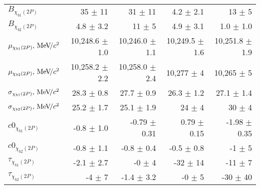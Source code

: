 \begin{table}[H]
{{\begin{tabular}{lrrrr}
\rule{0pt}{4ex}$B_{\chi_{b1}(2P)}$ & 35 $\pm$ 11 & 31 $\pm$ 11 & 4.2 $\pm$ 2.1 & 13 $\pm$ 5\\
$B_{\chi_{b2}(2P)}$ & 4.8 $\pm$ 3.2 & 11 $\pm$ 5 & 4.9 $\pm$ 3.1 & 1.0 $\pm$ 1.0\\

\rule{0pt}{4ex}$\mu_{\chi_{b1}(2P)}, {\mathrm{\,Me\kern -0.1em V\!/}c^2}$ & 10,248.6 $\pm$ 1.0 & 10,246.0 $\pm$ 1.1 & 10,249.5 $\pm$ 1.6 & 10,251.8 $\pm$ 1.9\\
$\mu_{\chi_{b2}(2P)}, {\mathrm{\,Me\kern -0.1em V\!/}c^2}$ & 10,258.2 $\pm$ 2.2 & 10,258.0 $\pm$ 2.4 & 10,277 $\pm$ 4 & 10,265 $\pm$ 5\\

\rule{0pt}{4ex}$\sigma_{\chi_{b1}(2P)}, {\mathrm{\,Me\kern -0.1em V\!/}c^2}$ & 28.3 $\pm$ 0.8 & 27.7 $\pm$ 0.9 & 26.3 $\pm$ 1.2 & 27.1 $\pm$ 1.4\\
$\sigma_{\chi_{b2}(2P)}, {\mathrm{\,Me\kern -0.1em V\!/}c^2}$ & 25.2 $\pm$ 1.7 & 25.1 $\pm$ 1.9 & 24 $\pm$ 4 & 30 $\pm$ 4\\

\rule{0pt}{4ex}$c0_{\chi_{b1}(2P)}$ & -0.8 $\pm$ 1.0 & -0.79 $\pm$ 0.31 & 0.79 $\pm$ 0.15 & -1.98 $\pm$ 0.35\\
$c0_{\chi_{b2}(2P)}$ & -0.8 $\pm$ 1.1 & -0.8 $\pm$ 0.4 & -0.5 $\pm$ 0.8 & -1 $\pm$ 5\\

\rule{0pt}{4ex}$\tau_{\chi_{b1}(2P)}$ & -2.1 $\pm$ 2.7 & -0 $\pm$ 4 & -32 $\pm$ 14 & -11 $\pm$ 7\\
$\tau_{\chi_{b2}(2P)}$ & -4 $\pm$ 7 & -1.4 $\pm$ 3.2 & -0 $\pm$ 5 & -30 $\pm$ 40\\
\bottomrule
\end{tabular}
} %

} %
\label{tab:mc:chib2p_ups1s:fits}
\end{table}

